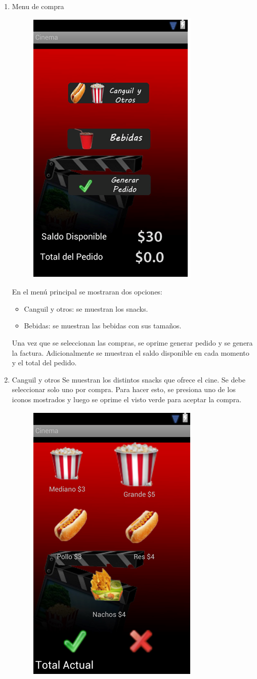 \documentclass[20pt]{article}
\begin{document}
\begin{enumerate}
\item Menu de compra\\
\begin{figure}[h]
\begin{center}
\includegraphics[width=100 pt]{./menu_de_compra.jpg}
\end{center}
\end{figure}
En el menú principal se mostraran dos opciones: 
\begin{itemize}
\item Canguil y otros: se muestran los snacks. 
\item Bebidas: se muestran las bebidas con sus tamaños.
\end{itemize}

Una vez que se seleccionan las compras, se oprime generar pedido y se genera la factura. Adicionalmente se muestran el saldo disponible en cada momento y el total del pedido.

\item Canguil y otros
Se muestran los distintos snacks que ofrece el cine. Se debe seleccionar solo uno por compra. Para hacer esto, se presiona uno de los iconos mostrados y luego se oprime el visto verde para aceptar la compra.

\begin{figure}[h]
\begin{center}
\includegraphics[width=100 pt]{./canguil_y_otros.jpg}
\end{center}
\end{figure}


\end{enumerate}
\end{document}
